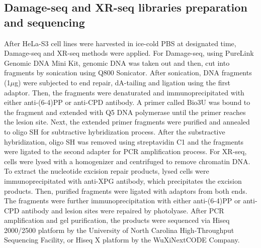 \subsection{Damage-seq and XR-seq libraries preparation and sequencing}
After HeLa-S3 cell lines were harvested in ice-cold PBS at designated time, Damage-seq and XR-seq methods were applied. For Damage-seq, using PureLink Genomic DNA Mini Kit, genomic DNA was taken out and then, cut into fragments by sonication using Q800 Sonicator. After sonication, DNA fragments (1$\mu$g) were subjected to end repair, dA-tailing and ligation using the first adaptor. Then, the fragments were denaturated and immunoprecipitated with either anti-(6-4)PP or anti-CPD antibody. A primer called Bio3U was bound to the fragment and extended with Q5 DNA polymerase until the primer reaches the lesion site. Next, the extended primer fragments were purified and annealed to oligo SH for subtractive hybridization process. After the substractive hybridization, oligo SH was removed using streptavidin C1 and the fragments were ligated to the second adapter for PCR amplification process. For XR-seq, cells were lysed with a homogenizer and centrifuged to remove chromatin DNA. To extract the nucleotide excision repair products, lysed cells were immunoprecipitated with anti-XPG antibody, which precipitates the excision products. Then, purified fragments were ligated with adaptors from both ends. The fragments were further immunoprecipitation with either anti-(6-4)PP or anti-CPD antibody and lesion sites were repaired by photolyase. After PCR amplification and gel purification, the products were sequenced via Hiseq 2000/2500 platform by the University of North Carolina High-Throughput Sequencing Facility, or Hiseq X platform by the WuXiNextCODE Company.  


